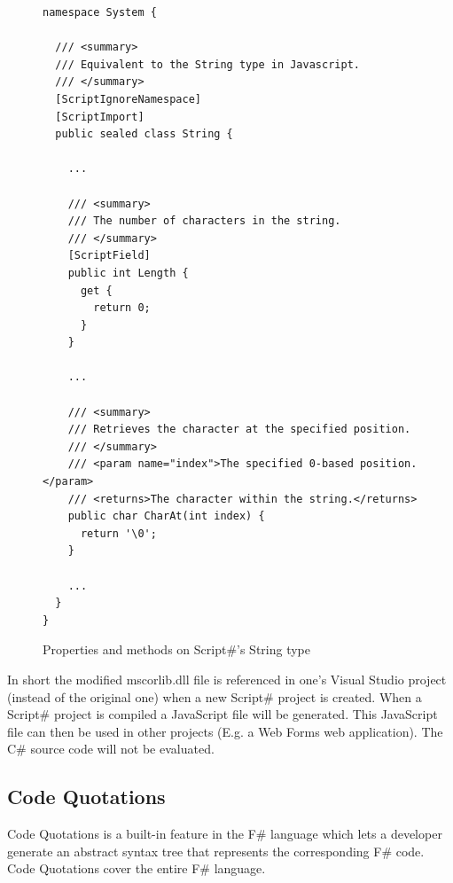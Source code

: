 		\begin{figure}
			\begin{lstlisting}[language=CSharp,classoffset=1,morekeywords={String}]
namespace System {

  /// <summary>
  /// Equivalent to the String type in Javascript.
  /// </summary>
  [ScriptIgnoreNamespace]
  [ScriptImport]
  public sealed class String {

    ...

    /// <summary>
    /// The number of characters in the string.
    /// </summary>
    [ScriptField]
    public int Length {
      get {
        return 0;
      }
    }

    ...

    /// <summary>
    /// Retrieves the character at the specified position.
    /// </summary>
    /// <param name="index">The specified 0-based position.</param>
    /// <returns>The character within the string.</returns>
    public char CharAt(int index) {
      return '\0';
    }

    ...
  }
}

			\end{lstlisting}
			\caption{Properties and methods on Script\#'s String type}
			\label{fig:scriptsharp_net_types}
		\end{figure}

		In short the modified mscorlib.dll file is referenced in one's Visual Studio project (instead of the original one) when a new Script\# project is created. When a Script\# project is compiled a JavaScript file will be generated. This JavaScript file can then be used in other projects (E.g. a Web Forms web application). The C\# source code will not be evaluated.




	\subsection{Code Quotations} %
	\label{ssub:code_quotations}
		Code Quotations is a built-in feature in the F\# language which lets a developer generate an abstract syntax tree that represents the corresponding F\# code. Code Quotations cover the entire F\# language.

